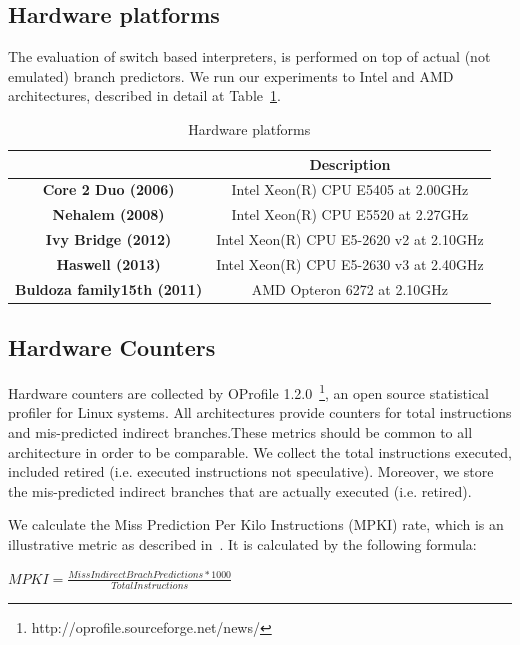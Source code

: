 \documentclass[parskip=full, paper=a4, fontsize=12pt]{scrartcl}
\numberwithin{equation}{section}
\numberwithin{figure}{section}
\numberwithin{table}{section}
\begin{document}
\subsection{Hardware platforms}
The evaluation of switch based interpreters, is performed on top of
actual (not emulated) branch predictors. We run our experiments to
Intel and AMD architectures, described in detail at Table~\ref{hw_p}.

\begin{table}[]
	\centering
	\caption{Hardware platforms}
	\label{hw_p}
	\begin{tabular}{|c|c|}
		\hline
		\textbf{}                           & \textbf{Description}                      \\ 
        \hline
		\textbf{Core 2 Duo (2006)}          & Intel Xeon(R) CPU E5405 at 2.00GHz        \\ 
        \hline
		\textbf{Nehalem (2008)}             & Intel Xeon(R) CPU E5520 at 2.27GHz        \\
        \hline
		\textbf{Ivy Bridge (2012)}          & Intel Xeon(R) CPU E5-2620 v2 at 2.10GHz   \\ 
        \hline
		\textbf{Haswell (2013)}             & Intel Xeon(R) CPU E5-2630 v3 at 2.40GHz   \\ 
        \hline
		\textbf{Buldoza family15th (2011)}  & AMD Opteron 6272 at 2.10GHz               \\ 
        \hline
	\end{tabular}
\end{table}

\subsection{Hardware Counters}
Hardware counters are collected by OProfile
1.2.0~\footnote{http://oprofile.sourceforge.net/news/}, an open source
statistical profiler for Linux systems. All architectures provide counters for
total instructions and mis-predicted indirect branches.These metrics should be
common to all architecture in order to be comparable. We collect the total
instructions executed, included retired (i.e. executed instructions not
speculative). Moreover, we  store the mis-predicted indirect branches that are
actually executed (i.e. retired).

We calculate the Miss Prediction Per Kilo Instructions (MPKI) rate, which is an
illustrative metric as described in~\cite{performance_of_interpreters}. It is
calculated by the following formula:
\begin{center}
   $ MPKI = \frac{Miss Indirect Brach Predictions * 1000}{Total Instructions} $
\end{center}
\end{document}
